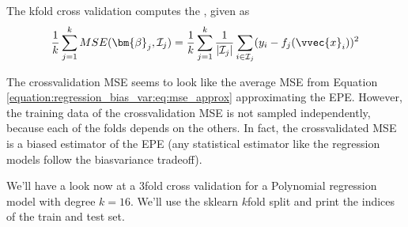 \documentclass[letterpaper,10pt,english]{jupyterBook}
\begin{document}
\sphinxAtStartPar
The k\sphinxhyphen{}fold cross validation computes the , given as
\begin{equation*}
\begin{split}\frac1k\sum_{j=1}^k MSE(\bm{\beta}_j,\mathcal{I}_j)= \frac1k\sum_{j=1}^k\frac{1}{\lvert\mathcal{I}_j\rvert}\sum_{i\in\mathcal{I}_j}(y_i-f_j(\vvec{x}_i))^2\end{split}
\end{equation*}

\sphinxAtStartPar
The cross\sphinxhyphen{}validation MSE seems to look like the average MSE from Equation \eqref{equation:regression_bias_var:eq:mse_approx} approximating the EPE. However, the training data of the cross\sphinxhyphen{}validation MSE is not sampled independently, because each of the folds depends on the others. In fact, the cross\sphinxhyphen{}validated MSE is a biased estimator of the EPE (any statistical estimator like the regression models follow the bias\sphinxhyphen{}variance tradeoff).

\sphinxAtStartPar
We’ll have a look now at a 3\sphinxhyphen{}fold cross validation for a Polynomial regression model with degree \(k=16\). We’ll use the sklearn \(k\)\sphinxhyphen{}fold split and print the indices of the train and test set.
\end{document}
